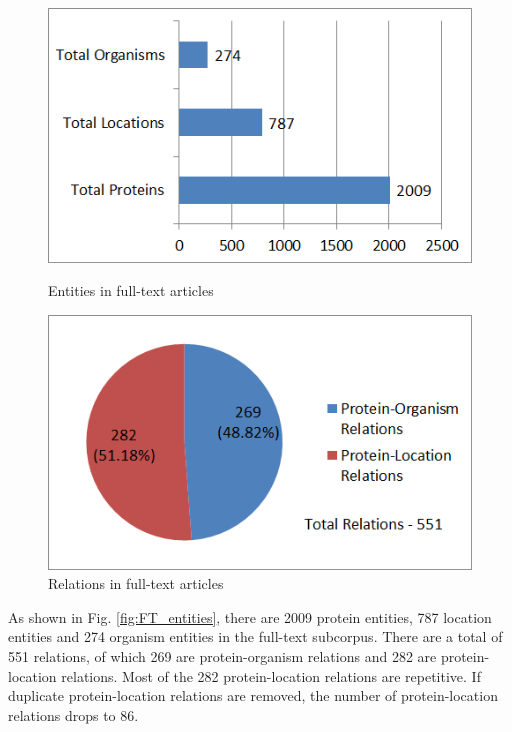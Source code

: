 \begin{figure}
\centering
\begin{minipage}{.5\textwidth}
  \centering
  \includegraphics[width=.95\textwidth]{figures/1_FullTextEntities.png}
  \caption{Entities in full-text articles}
  \label{fig:FT_entities}
\end{minipage}%
\begin{minipage}{.5\textwidth}
  \centering
  \includegraphics[width=.95\textwidth]{figures/1_FullTextRelationDistribution.png}
  \caption{Relations in full-text articles}
  \label{fig:FT_relations}
\end{minipage}
\end{figure}

As shown in Fig. \ref{fig:FT_entities}, there are 2009 protein entities, 787 location entities and 274 organism entities in the full-text subcorpus. There are a total of 551 relations, of which 269 are protein-organism relations and 282 are protein-location relations. Most of the 282 protein-location relations are repetitive. If duplicate protein-location relations are removed, the number of protein-location relations drops to 86.

